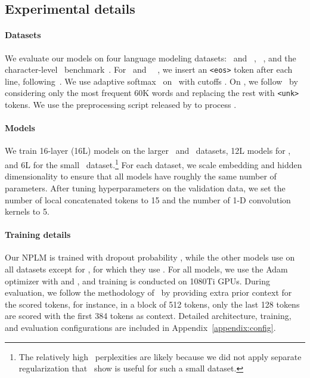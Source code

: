 \documentclass[11pt]{article}
\begin{document}
\subsection{Experimental details}

\paragraph{Datasets} We evaluate our models on four language modeling datasets: \wttwo\ and \wtthree~\citep{merity2016pointer}, \lambada~\citep{paperno-etal-2016-lambada}, and the character-level  \enwik\ benchmark~\citep{merity2017regularizing}. 
For \wttwo\ and \wtthree\ ~\cite{merity2016pointer}, we insert an \texttt{<eos>} token after each line, following~\citet{merity2018analysis}. We use adaptive softmax~\cite{pmlr-v70-grave17a} on \wtthree\ with cutoffs . On \lambada, we follow~\citet{paperno-etal-2016-lambada} by considering only the most frequent 60K words and replacing the rest with \texttt{<unk>} tokens. We use the preprocessing script released by \citet{merity2017regularizing} to process \enwik.



\paragraph{Models} We train 16-layer (16L) models on the larger \wtthree\ and \lambada\ datasets, 12L models for \enwik, and 6L for the small \wttwo\ dataset.\footnote{The relatively high \wttwo\ perplexities are likely because we did not apply separate regularization that~\citet{merity2017regularizing} show is useful for such a small dataset.} For each dataset, we scale embedding and hidden dimensionality to ensure that all models have roughly the same number of parameters. After tuning hyperparameters on the validation data, we set the number of local concatenated tokens to 15 and the number of 1-D convolution kernels to 5. 

\paragraph{Training details} Our NPLM is trained with dropout probability , while the other models use  on all datasets except for \wttwo, for which they use . For all models, we use the Adam optimizer with  and , and training is conducted on 1080Ti GPUs. During evaluation, we follow the methodology of~\cite{knnlm} by providing extra prior context for the scored tokens, 
for instance, in a block of 512 tokens, only the last 128 tokens are scored with the first 384 tokens as context. Detailed architecture, training, and evaluation configurations are included in Appendix~\ref{appendix:config}.
\end{document}
